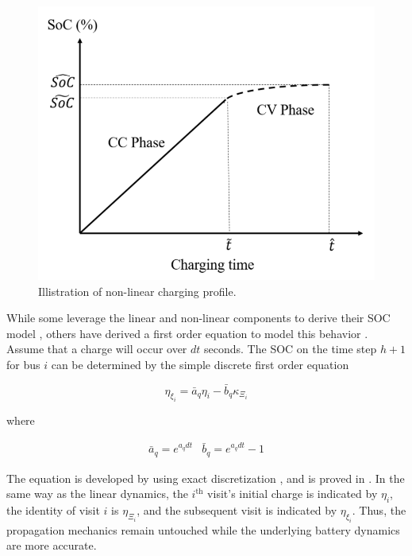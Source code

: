 \documentclass[ee,msthesis]{usuthesis}
\begin{document}
\begin{figure}[htbp]
\centering
\includegraphics[width=.9\linewidth]{img/soc-plot.png}
\caption{\label{fig:soc-plot}Illistration of non-linear charging profile.}
\end{figure}

While some leverage the linear and non-linear components to derive their SOC model \cite{abdollahi-2016-optim-batter},
others have derived a first order equation to model this behavior \cite{whitaker-2023-a-network}. Assume that a charge
will occur over \(dt\) seconds. The SOC on the time step \(h+1\) for bus \(i\) can be determined by the simple discrete first
order equation

\begin{equation}
  \eta_{\xi_i} = \bar{a}_q \eta_i - \bar{b}_q \kappa_{\Xi_i}
\end{equation}

where

\begin{equation}
\begin{array}{cc}
  \bar{a}_q = e^{a_q dt} & \bar{b}_q = e^{a_q dt} - 1
\end{array}
\end{equation}

The equation is developed by using exact discretization \cite{hespanha-2018-linear}, and is proved in
\cite{whitaker-2023-a-network}. In the same way as the linear dynamics, the \(i^{\text{th}}\) visit's initial charge is
indicated by \(\eta_i\), the identity of visit \(i\) is \(\eta_{\Xi_i}\), and the subsequent visit is indicated by \(\eta_{\xi_i}\). Thus,
the propagation mechanics remain untouched while the underlying battery dynamics are more accurate.
\end{document}
